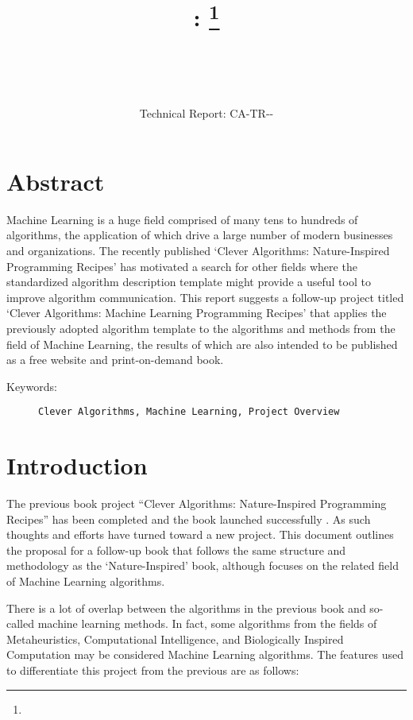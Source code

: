 \documentclass[a4paper, 11pt]{article}
\title{{\myreporttitle}: {\myreportsubtitle}\footnote{\myreportlicense}}
\author{\myreportauthor\\{\myreportemail}\\\small\myreportproject}
\date{\myreportfulldate\\{\small{Technical Report: CA-TR-{\myreportdate}-\myreportversion}}}
\begin{document}
\maketitle

\section*{Abstract} 
Machine Learning is a huge field comprised of many tens to hundreds of algorithms, the application of which drive a large number of modern businesses and organizations.
The recently published `Clever Algorithms: Nature-Inspired Programming Recipes' has motivated a search for other fields where the standardized algorithm description template might provide a useful tool to improve algorithm communication.
This report suggests a follow-up project titled `Clever Algorithms: Machine Learning Programming Recipes' that applies the previously adopted algorithm template to the algorithms and methods from the field of Machine Learning, the results of which are also intended to be published as a free website and print-on-demand book.

\begin{description}
	\item[Keywords:] {\small\texttt{Clever Algorithms, Machine Learning, Project Overview}}
\end{description} 

\section{Introduction}
\label{sec:introduction}
The previous book project ``Clever Algorithms: Nature-Inspired Programming Recipes'' has been completed and the book launched successfully \cite{Brownlee2011}. As such thoughts and efforts have turned toward a new project. This document outlines the proposal for a follow-up book that follows the same structure and methodology as the `Nature-Inspired' book, although focuses on the related field of Machine Learning algorithms.

There is a lot of overlap between the algorithms in the previous book and so-called machine learning methods. In fact, some algorithms from the fields of Metaheuristics, Computational Intelligence, and Biologically Inspired Computation may be considered Machine Learning algorithms. The features used to differentiate this project from the previous are as follows:
\end{document}
